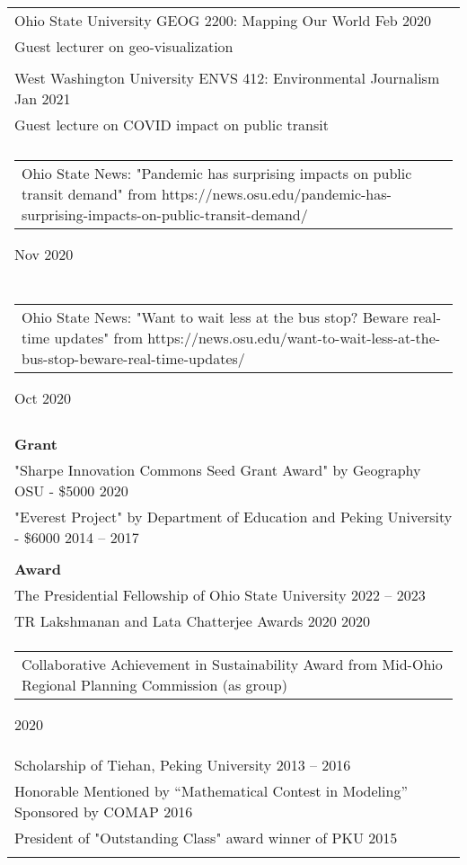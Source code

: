 \documentclass[letterpaper, 11pt]{article}
\begin{document}
\begin{longtable}{p{6.5in}}
Ohio State University GEOG 2200: Mapping Our World \hfill Feb 2020\\
Guest lecturer on geo-visualization \\\\

West Washington University ENVS 412: Environmental Journalism \hfill Jan 2021\\
Guest lecture on COVID impact on public transit \\\\

\begin{tabular}{p{5in}}
Ohio State News: "Pandemic has surprising impacts on public transit demand" from https://news.osu.edu/pandemic-has-surprising-impacts-on-public-transit-demand/
\end{tabular} \hfill Nov 2020 \\\\

\begin{tabular}{p{5in}}
Ohio State News: "Want to wait less at the bus stop? Beware real-time updates" from https://news.osu.edu/want-to-wait-less-at-the-bus-stop-beware-real-time-updates/ 
\end{tabular} \hfill Oct 2020 \\\\

\textbf{Grant} \\
"Sharpe Innovation Commons Seed Grant Award" by Geography OSU - \$5000 \hfill 2020 \\
"Everest Project" by Department of Education and Peking University - \$6000 \hfill 2014 -- 2017 \\\\

\textbf{Award} \\
The Presidential Fellowship of Ohio State University \hfill 2022 -- 2023 \\
TR Lakshmanan and Lata Chatterjee Awards 2020 \hfill 2020 \\
\begin{tabular}{p{5in}}
Collaborative Achievement in Sustainability Award from Mid-Ohio Regional Planning Commission (as group) \end{tabular}\hfill 2020 \\
Scholarship of Tiehan, Peking University \hfill 2013 -- 2016 \\
Honorable Mentioned by “Mathematical Contest in Modeling” Sponsored by COMAP \hfill 2016 \\
President of "Outstanding Class" award winner of PKU \hfill 2015 \\\\


\end{longtable}
\end{document}
